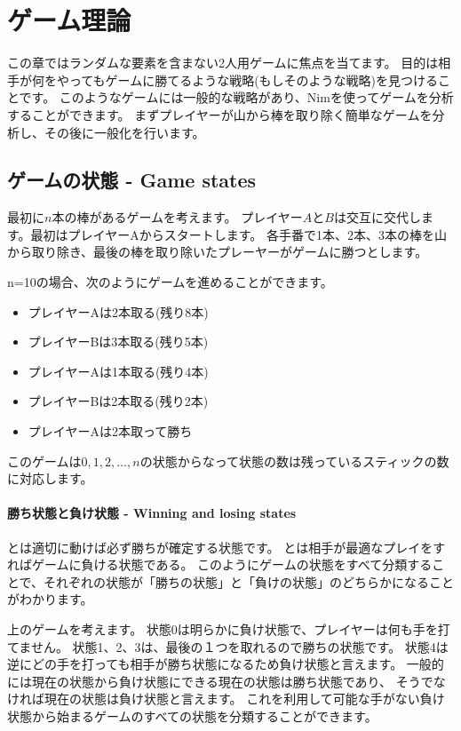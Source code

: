 \chapter{ゲーム理論}

この章ではランダムな要素を含まない2人用ゲームに焦点を当てます。
目的は相手が何をやってもゲームに勝てるような戦略(もしそのような戦略)を見つけることです。
このようなゲームには一般的な戦略があり、Nimを使ってゲームを分析することができます。
まずプレイヤーが山から棒を取り除く簡単なゲームを分析し、その後に一般化を行います。

\section{ゲームの状態 - Game states}

最初に$n$本の棒があるゲームを考えます。
プレイヤー$A$と$B$は交互に交代します。最初はプレイヤーAからスタートします。
各手番で1本、2本、3本の棒を山から取り除き、最後の棒を取り除いたプレーヤーがゲームに勝つとします。

n=10の場合、次のようにゲームを進めることができます。
\begin{itemize}[noitemsep]
\item プレイヤーAは2本取る(残り8本)
\item プレイヤーBは3本取る(残り5本)
\item プレイヤーAは1本取る(残り4本)
\item プレイヤーBは2本取る(残り2本)
\item プレイヤーAは2本取って勝ち
\end{itemize}

このゲームは$0,1,2,\ldots,n$の状態からなって状態の数は残っているスティックの数に対応します。

\subsubsection{勝ち状態と負け状態 - Winning and losing states}


とは適切に動けば必ず勝ちが確定する状態です。
とは相手が最適なプレイをすればゲームに負ける状態である。
このようにゲームの状態をすべて分類することで、それぞれの状態が「勝ちの状態」と「負けの状態」のどちらかになることがわかります。

上のゲームを考えます。
状態0は明らかに負け状態で、プレイヤーは何も手を打てません。
状態1、2、3は、最後の１つを取れるので勝ちの状態です。
状態4は逆にどの手を打っても相手が勝ち状態になるため負け状態と言えます。
一般的には現在の状態から負け状態にできる現在の状態は勝ち状態であり、
そうでなければ現在の状態は負け状態と言えます。
これを利用して可能な手がない負け状態から始まるゲームのすべての状態を分類することができます。

